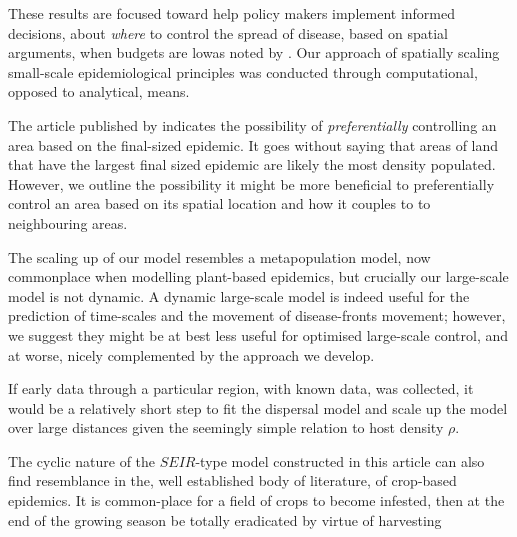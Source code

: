 These results are focused toward help policy makers implement informed decisions, about \textit{where} to control the spread of disease, based on spatial arguments, when budgets are low\textemdash as noted by \cite{time-varying-infectivity}. Our approach of spatially scaling small-scale epidemiological principles was conducted through computational, opposed to analytical, means. 

The article published by \cite{time-varying-infectivity} indicates the possibility of \textit{preferentially} controlling an area based on the final-sized epidemic. It goes without saying that areas of land that have the largest final sized epidemic are likely the most density populated. However, we outline the possibility it might be more beneficial to preferentially control an area based on its spatial location and how it couples to to neighbouring areas.

The scaling up of our model resembles a metapopulation model, now commonplace when modelling plant-based epidemics, but crucially our large-scale model is not dynamic. A dynamic large-scale model is indeed useful for the prediction of time-scales and the movement of disease-fronts movement; however, we suggest they might be at best less useful for optimised large-scale control, and at worse, nicely complemented by the approach we develop.

If early data through a particular region, with known data, was collected, it would be a relatively short step to fit the dispersal model and scale up the model over large distances given the seemingly simple relation to host density $\rho$.


The cyclic nature of the $SEIR$-type model constructed in this article can also find resemblance in the, well established body of literature, of crop-based epidemics. It is common-place for a field of crops to become infested, then at the end of the growing season be totally eradicated by virtue of harvesting %

